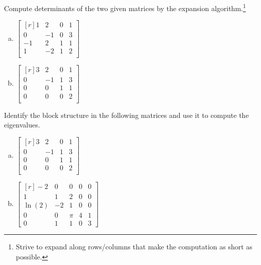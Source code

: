       \begin{question}
        Compute determinants of the two given matrices by the expansion algorithm.\footnote{Strive to expand along rows/columns that make the computation as short as possible.}

        \begin{enumerate}[(a)]
        \item
        \( \begin{bmatrix*}[r]
            1 & 2 & 0 & 1 \\
            0 & -1 & 0 & 3 \\
            -1 & 2 & 1 & 1 \\
            1 & -2 & 1 & 2 \\
          \end{bmatrix*} \)
          \solspace{1.25in}
        \item
        \( \begin{bmatrix*}[r]
            3 & 2 & 0 & 1 \\
            0 & -1 & 1 & 3 \\
            0 & 0 & 1 & 1 \\
            0 & 0 & 0 & 2 \\
          \end{bmatrix*} \)
          \solspace{1.25in}
        \end{enumerate}
      \end{question}

      \begin{question}
        Identify the block structure in the following matrices and use it to compute the eigenvalues.
        \begin{enumerate}[(a)]
        \item \( \begin{bmatrix*}[r]
            3 & 2 & 0 & 1 \\
            0 & -1 & 1 & 3 \\
            0 & 0 & 1 & 1 \\
            0 & 0 & 0 & 2 \\
          \end{bmatrix*} \)
        \item \(\begin{bmatrix*}[r]
              -2 & 0 & 0 & 0 & 0\\
              1 & 1 & 2 & 0 & 0\\
              \ln(2) & -2 & 1 & 0 & 0\\
              0 & 0 & \pi & 4 & 1\\
              0 & 1 & 1 & 0 & 3
            \end{bmatrix*}\)
            \solspace{1in}
        \end{enumerate}
      \end{question}

